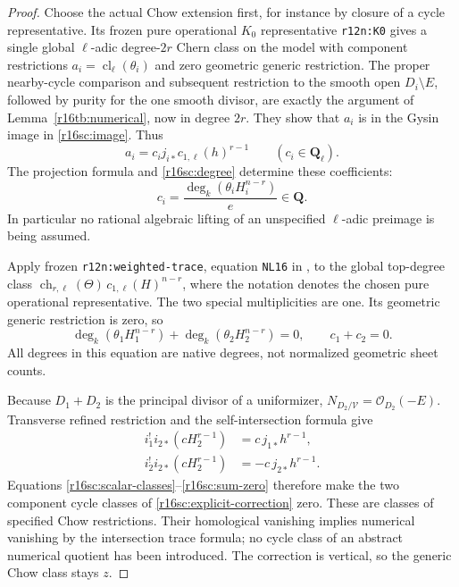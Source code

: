 \begin{proof}
Choose the actual Chow extension first, for instance by closure of
a cycle representative. Its frozen pure operational $K_0$
representative \texttt{r12n:K0} gives a single global $\ell$-adic
degree-$2r$ Chern class on the model with component restrictions
$a_i=\operatorname{cl}_\ell(\theta_i)$ and zero geometric generic
restriction. The proper nearby-cycle comparison and subsequent
restriction to the smooth open $D_i\setminus E$, followed by
purity for the one smooth divisor, are exactly the argument of
Lemma~\ref{r16tb:numerical}, now in degree $2r$.
They show that $a_i$ is in the Gysin image in
\eqref{r16sc:image}. Thus
\[
                   a_i=c_i j_{i*}c_{1,\ell}(h)^{r-1}
                   \qquad(c_i\in\mathbf Q_\ell).
 \tag{SC16.4}\label{r16sc:scalar-classes}
\]
The projection formula and \eqref{r16sc:degree} determine
these coefficients:
\[
                  c_i=\frac{\deg_k(\theta_i H_i^{n-r})}{e}
                           \in\mathbf Q.
 \tag{SC16.5}\label{r16sc:rational-coefficients}
\]
In particular no rational algebraic lifting of an unspecified
$\ell$-adic preimage is being assumed.

Apply frozen \texttt{r12n:weighted-trace}, equation \texttt{NL16}
in ,
to the global top-degree class
$\operatorname{ch}_{r,\ell}(\Theta)\,c_{1,\ell}(H)^{n-r}$,
where the notation denotes the chosen pure operational
representative. The two special multiplicities are one.
Its geometric generic restriction is zero, so
\[
 \deg_k(\theta_1H_1^{n-r})+
 \deg_k(\theta_2H_2^{n-r})=0,
             \qquad c_1+c_2=0.
 \tag{SC16.6}\label{r16sc:sum-zero}
\]
All degrees in this equation are native degrees, not normalized
geometric sheet counts.

Because $D_1+D_2$ is the principal divisor of a uniformizer,
$N_{D_2/\mathcal V}=\mathcal O_{D_2}(-E)$. Transverse refined
restriction and the self-intersection formula give
\[
 \begin{split}
 i_1^!i_{2*}(cH_2^{r-1})&=c\,j_{1*}h^{r-1},\\
 i_2^!i_{2*}(cH_2^{r-1})&=-c\,j_{2*}h^{r-1}.
 \end{split}
 \tag{SC16.7}\label{r16sc:correction-signs}
\]
Equations \eqref{r16sc:scalar-classes}--\eqref{r16sc:sum-zero}
therefore make the two component cycle classes of
\eqref{r16sc:explicit-correction} zero. These are classes of
specified Chow restrictions. Their homological vanishing implies
numerical vanishing by the intersection trace formula; no cycle
class of an abstract numerical quotient has been introduced.
The correction is vertical, so the generic Chow class stays $z$.
\end{proof}

